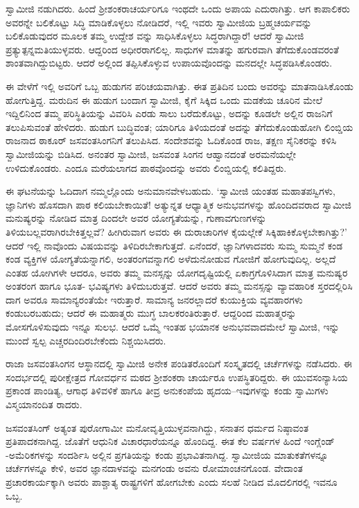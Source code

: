 ಸ್ವಾಮೀಜಿ ನಡುಗಿದರು. ಹಿಂದೆ ಶ್ರೀಶಂಕರಾಚರ್ಯರಿಗೂ ಇಂಥದೇ ಒಂದು ಅಪಾಯ ಎದುರಾಗಿತ್ತು. ಆಗ ಕಾಪಾಲಿಕರು ಅವರನ್ನೇ ಬಲಿಕೊಟ್ಟು ಸಿದ್ಧಿ ಮಾಡಿಕೊಳ್ಳಲು ನೋಡಿದರೆ, ಇಲ್ಲಿ ಇವರು ಸ್ವಾಮೀಜಿಯ ಬ್ರಹ್ಮಚರ್ಯವನ್ನು ಬಲಿಕೊಡುವುದರ ಮೂಲಕ ತಮ್ಮ ಉದ್ದೇಶ ವನ್ನು ಸಾಧಿಸಿಕೊಳ್ಳಲು ಸಿದ್ಧರಾಗಿದ್ದಾರೆ! ಆದರೆ ಸ್ವಾಮೀಜಿ ಪ್ರತ್ಯುತ್ಪನ್ನಮತಿಯುಳ್ಳವರು. ಆದ್ದರಿಂದ ಅಧೀರರಾಗಲಿಲ್ಲ. ಸಾಧುಗಳ ಮಾತನ್ನು ಹಗುರವಾಗಿ ತೆಗೆದುಕೊಂಡವರಂತೆ ಶಾಂತವಾಗಿದ್ದುಬಿಟ್ಟರು. ಆದರೆ ಅಲ್ಲಿಂದ ತಪ್ಪಿಸಿಕೊಳ್ಳುವ ಉಪಾಯವೊಂದನ್ನು ಮನದಲ್ಲೇ ಸಿದ್ಧಪಡಿಸಿಕೊಂಡರು.

ಈ ವೇಳೆಗೆ ಇಲ್ಲಿ ಅವರಿಗೆ ಒಬ್ಬ ಹುಡುಗನ ಪರಿಚಯವಾಗಿತ್ತು. ಈತ ಪ್ರತಿದಿನ ಬಂದು ಅವರನ್ನು ಮಾತನಾಡಿಸಿಕೊಂಡು ಹೋಗುತ್ತಿದ್ದ. ಮರುದಿನ ಈ ಹುಡುಗ ಬಂದಾಗ ಸ್ವಾಮೀಜಿ, ಕೈಗೆ ಸಿಕ್ಕಿದ ಒಂದು ಮಡಕೆಯ ಚೂರಿನ ಮೇಲೆ ಇದ್ದಿಲಿನಿಂದ ತಮ್ಮ ಪರಿಸ್ಥಿತಿಯನ್ನು ವಿವರಿಸಿ ಎರಡು ಸಾಲು ಬರೆದುಕೊಟ್ಟು, ಅದನ್ನು ಕೂಡಲೇ ಅಲ್ಲಿನ ರಾಜನಿಗೆ ತಲುಪಿಸುವಂತೆ ಹೇಳಿದರು. ಹುಡುಗ ಬುದ್ಧಿವಂತ; ಯಾರಿಗೂ ತಿಳಿಯದಂತೆ ಅದನ್ನು ತೆಗೆದುಕೊಂಡುಹೋಗಿ ಲಿಂಬ್ಡಿಯ ರಾಜನಾದ ಠಾಕೂರ್ ಜಸವಂತಸಿಂಗನಿಗೆ ತಲುಪಿಸಿದ. ಸಂದೇಶವನ್ನು ಓದಿಕೊಂಡ ರಾಜ, ತಕ್ಷಣ ಸೈನಿಕರನ್ನು ಕಳಿಸಿ ಸ್ವಾಮೀಜಿಯನ್ನು ಬಿಡಿಸಿದ. ಅನಂತರ ಸ್ವಾಮೀಜಿ, ಜಸವಂತ ಸಿಂಗನ ಆಹ್ವಾನದಂತೆ ಅರಮನೆಯಲ್ಲೇ ಉಳಿದುಕೊಂಡರು. ಎಂದೂ ಮರೆಯಲಾಗದ ಪಾಠವೊಂದನ್ನು ಅವರು ಲಿಂಬ್ಡಿಯಲ್ಲಿ ಕಲಿತಿದ್ದರು.

ಈ ಘಟನೆಯನ್ನು ಓದಿದಾಗ ನಮ್ಮಲ್ಲೊಂದು ಅನುಮಾನವೇಳಬಹುದು. ‘ಸ್ವಾಮೀಜಿ ಯಂತಹ ಮಹಾತಪಸ್ವಿಗಳು, ಜ್ಞಾನಿಗಳು ಹೊಸದಾಗಿ ಪಾಠ ಕಲಿಯಬೇಕಾಯಿತೆ! ಅತ್ಯುನ್ನತ ಆಧ್ಯಾತ್ಮಿಕ ಅನುಭವಗಳನ್ನು ಹೊಂದಿದವರಾದ ಸ್ವಾಮೀಜಿ ಮನುಷ್ಯರನ್ನು ನೋಡಿದ ಮಾತ್ರ ದಿಂದಲೇ ಅವರ ಯೋಗ್ಯತೆಯನ್ನು, ಗುಣಾವಗುಣಗಳನ್ನು ತಿಳಿಯಬಲ್ಲವರಾಗಿರಬೇಕಿತ್ತಲ್ಲವೆ? ಹೀಗಿರುವಾಗ ಅವರು ಈ ದುರಾಚಾರಿಗಳ ಕೈಯಲ್ಲೇಕೆ ಸಿಕ್ಕಿಹಾಕಿಕೊಳ್ಳಬೇಕಾಗಿತ್ತು?’ ಆದರೆ ಇಲ್ಲಿ ನಾವೊಂದು ವಿಷಯವನ್ನು ತಿಳಿದಿರಬೇಕಾಗುತ್ತದೆ. ಏನೆಂದರೆ, ಜ್ಞಾನಿಗಳಾದವರು ಸುಮ್ಮ ಸುಮ್ಮನೆ ಕಂಡ ಕಂಡ ವ್ಯಕ್ತಿಗಳ ಯೋಗ್ಯತೆಯನ್ನಾಗಲಿ, ಅಂತರಂಗವನ್ನಾಗಲಿ ಅಳೆದುನೋಡುವ ಗೋಜಿಗೆ ಹೋಗುವುದಿಲ್ಲ. ಅಲ್ಲದೆ ಎಂತಹ ಯೋಗಿಗಳೇ ಆದರೂ, ಅವರು ತಮ್ಮ ಮನಸ್ಸನ್ನು ಯೋಗದೃಷ್ಟಿಯಲ್ಲಿ ಏಕಾಗ್ರಗೊಳಿಸಿದಾಗ ಮಾತ್ರ ಮನುಷ್ಯರ ಅಂತರಂಗ ಹಾಗೂ ಭೂತ- ಭವಿಷ್ಯಗಳು ತಿಳಿದುಬರುತ್ತವೆ. ಆದರೆ ಅವರು ತಮ್ಮ ಮನಸ್ಸನ್ನು ವ್ಯಾವಹಾರಿಕ ಸ್ತರದಲ್ಲಿರಿಸಿ ದಾಗ ಅವರೂ ಸಾಮಾನ್ಯರಂತೆಯೇ ಇರುತ್ತಾರೆ. ಸಾಮಾನ್ಯ ಜನರಲ್ಲಾದರೆ ಕುಯುಕ್ತಿಯ ವ್ಯವಹಾರಗಳು ಕಂಡುಬರಬಹುದು; ಆದರೆ ಈ ಮಹಾತ್ಮರು ಮುಗ್ಧ ಬಾಲಕರಂತಿರುತ್ತಾರೆ. ಆದ್ದರಿಂದ ಮಹಾತ್ಮರನ್ನು ಮೋಸಗೊಳಿಸುವುದು ಇನ್ನೂ ಸುಲಭ. ಆದರೆ ಒಮ್ಮೆ ಇಂತಹ ಭಯಾನಕ ಅನುಭವವಾದಮೇಲೆ ಸ್ವಾಮೀಜಿ, ಇನ್ನು ಮುಂದೆ ಸ್ವಲ್ಪ ಎಚ್ಚರದಿಂದಿರಬೇಕೆಂದು ನಿಶ್ಚಯಿಸಿದರು.

ರಾಜಾ ಜಸವಂತಸಿಂಗನ ಆಸ್ಥಾನದಲ್ಲಿ ಸ್ವಾಮೀಜಿ ಅನೇಕ ಪಂಡಿತರೊಂದಿಗೆ ಸಂಸ್ಕೃತದಲ್ಲಿ ಚರ್ಚೆಗಳನ್ನು ನಡೆಸಿದರು. ಈ ಸಂದರ್ಭದಲ್ಲಿ ಪುರೀಕ್ಷೇತ್ರದ ಗೋವರ್ಧನ ಮಠದ ಶ್ರೀಶಂಕರಾ ಚಾರ್ಯರೂ ಉಪಸ್ಥಿತರಿದ್ದರು. ಈ ಯುವಸಂನ್ಯಾಸಿಯ ಪ್ರಕಾಂಡ ಪಾಂಡಿತ್ಯ, ಆಗಾಧ ತಿಳಿವಳಿಕೆ ಹಾಗೂ ತೀವ್ರ ಅನುಕಂಪೆಯ ಹೃದಯ–ಇವುಗಳನ್ನು ಕಂಡು ಸ್ವಾಮಿಗಳು ವಿಸ್ಮಯಾನಂದಿತ ರಾದರು.

ಜಸವಂತಸಿಂಗ್ ಅತ್ಯಂತ ಪುರೋಗಾಮೀ ಮನೋವೃತ್ತಿಯುಳ್ಳವನಾಗಿದ್ದು, ಸನಾತನ ಧರ್ಮದ ನಿಷ್ಠಾವಂತ ಪ್ರತಿಪಾದಕನಾಗಿದ್ದ. ಜೊತೆಗೆ ಆಧುನಿಕ ವಿಚಾರಧಾರೆಯನ್ನೂ ಹೊಂದಿದ್ದ. ಈತ ಕೆಲ ವರ್ಷಗಳ ಹಿಂದೆ ಇಂಗ್ಲೆಂಡ್​-ಅಮೆರಿಕಗಳನ್ನು ಸಂದರ್ಶಿಸಿ ಅಲ್ಲಿನ ಪ್ರಗತಿಯನ್ನು ಕಂಡು ಪ್ರಭಾವಿತನಾಗಿದ್ದ. ಸ್ವಾಮೀಜಿಯ ಮಾತುಕತೆಗಳನ್ನೂ ಚರ್ಚೆಗಳನ್ನೂ ಕೇಳಿ, ಅವರ ಜ್ಞಾನದಾಳವನ್ನು ಮನಗಂಡು ಅವನು ರೋಮಾಂಚನಗೊಂಡ. ವೇದಾಂತ ಪ್ರಚಾರಕಾರ್ಯಕ್ಕಾಗಿ ಅವರು ಪಾಶ್ಚಾತ್ಯ ರಾಷ್ಟ್ರಗಳಿಗೆ ಹೋಗಬೇಕು ಎಂದು ಸಲಹೆ ನೀಡಿದ ಮೊದಲಿಗರಲ್ಲಿ ಇವನೂ ಒಬ್ಬ.

